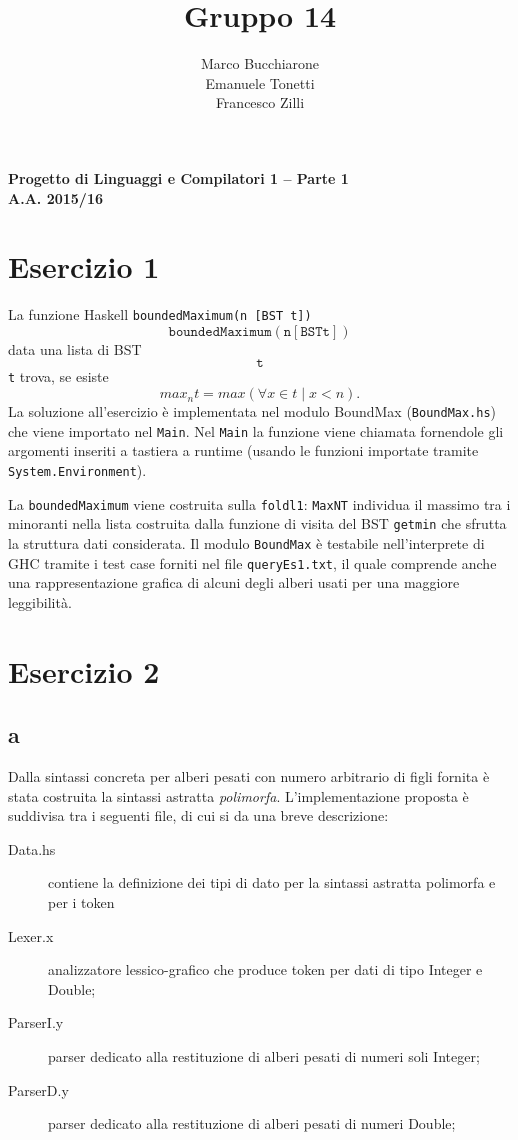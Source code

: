 \documentclass[a4paper, oneside, 11pt]{article}
\makeatletter
\renewcommand\and{\\}
\renewcommand\maketitle{%
\bigskip\bigskip\bigskip\bigskip%
\begin{center}\bfseries\large%
Progetto di Linguaggi e Compilatori 1 -- Parte 1 \\ A.A. 2015/16\\%
\end{center}%
\bigskip%
\begin{center}\bfseries\LARGE \@title  \end{center}%
\bigskip%
\begin{center}\bfseries\large \@author \end{center}%
\bigskip\bigskip}
\makeatother
\begin{document}
\title{Gruppo 14}
\author{Marco Bucchiarone \and Emanuele Tonetti \and Francesco Zilli}
\maketitle
%
\section*{Esercizio 1}
La funzione Haskell \texttt{boundedMaximum(n [BST t])} \[\mathtt{boundedMaximum(n [BST t])}\] data una lista di BST \[\mathtt{t}\] \texttt{t} trova, se esiste  \[max_{n}{t}=max(\forall x \in t \mid  x<n ).\]
La soluzione all'esercizio \`e implementata nel modulo BoundMax (\texttt{BoundMax.hs}) che viene importato nel \texttt{Main}.
Nel \texttt{Main} la funzione viene chiamata fornendole gli argomenti inseriti a tastiera a runtime (usando le funzioni importate tramite \texttt{System.Environment}).
\par
La \texttt{boundedMaximum} viene costruita sulla \texttt{foldl1}: \texttt{MaxNT} individua il massimo tra i minoranti nella lista costruita dalla funzione di visita del BST \texttt{getmin} che sfrutta la struttura dati considerata.
Il modulo \texttt{BoundMax} è testabile nell'interprete di GHC tramite i test case forniti nel file \texttt{queryEs1.txt}, il quale comprende anche una rappresentazione grafica di alcuni degli alberi usati per una maggiore leggibilit\`a.
%
\section*{Esercizio 2}
\subsection*{a}
Dalla sintassi concreta per alberi pesati con numero arbitrario di figli fornita \`e stata costruita la sintassi astratta \textit{polimorfa}.
L'implementazione proposta è suddivisa tra i seguenti file, di cui si da una breve descrizione:
\begin{description}
	\item[Data.hs] contiene la definizione dei tipi di dato per la sintassi astratta polimorfa  e per i token
	\item[Lexer.x] analizzatore lessico-grafico che produce token per dati di tipo Integer e Double;
	\item[ParserI.y] parser dedicato alla restituzione di alberi pesati di numeri soli Integer;
	\item[ParserD.y] parser dedicato alla restituzione di alberi pesati di numeri Double;
\end{description}	
\end{document}
